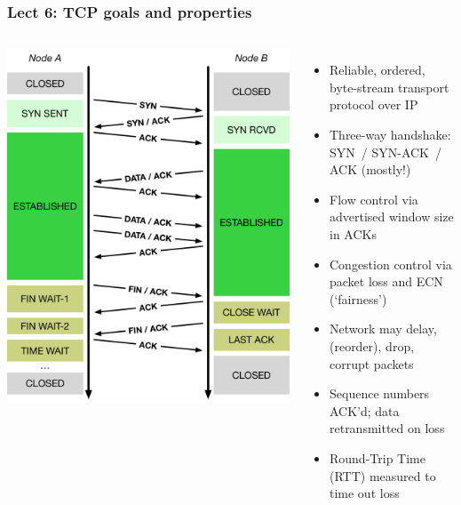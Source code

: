 \begin{frame}
  \frametitle{Lect 6: TCP goals and properties}

  \begin{columns}[T]
      \smallskip
      \begin{center}
	\includegraphics[width=1.15\textwidth]{../../figures/tcp-timeline.pdf}
      \end{center}

      \begin{itemize}
	\item Reliable, ordered, byte-stream transport protocol over IP
	\item Three-way handshake: SYN~/ SYN-ACK~/ ACK (mostly!)
        \item Flow control via advertised window size in ACKs
	\item Congestion control via packet loss and ECN (`fairness')

	\item Network may delay, (reorder), drop, corrupt packets
	\item Sequence numbers ACK'd; data retransmitted on loss
	\item Round-Trip Time (RTT) measured to time out loss
      \end{itemize}

  \end{columns}
\end{frame}


